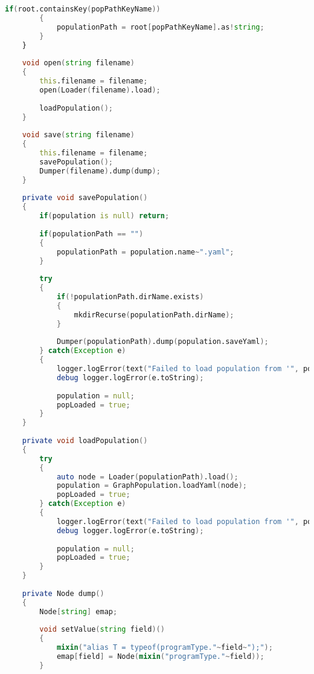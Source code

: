 \documentclass[russian,utf8,emptystyle]{eskdtext}
\begin{document}
\begin{lstlisting}[language=D]
        if(root.containsKey(popPathKeyName))
        {
            populationPath = root[popPathKeyName].as!string;
        }
    }
    
    void open(string filename)
    {
        this.filename = filename;
        open(Loader(filename).load);
        
        loadPopulation();
    }
    
    void save(string filename)
    {
        this.filename = filename;
        savePopulation();
        Dumper(filename).dump(dump);
    }
    
    private void savePopulation()
    {
        if(population is null) return;
        
        if(populationPath == "")
        {
            populationPath = population.name~".yaml";
        }
        
        try
        {
            if(!populationPath.dirName.exists)
            {
                mkdirRecurse(populationPath.dirName);
            }
            
            Dumper(populationPath).dump(population.saveYaml);
        } catch(Exception e)
        {
            logger.logError(text("Failed to load population from '", populationPath, "'. Reason: ", e.msg));
            debug logger.logError(e.toString);
            
            population = null;
            popLoaded = true;
        }
    }
    
    private void loadPopulation()
    {
        try
        {
            auto node = Loader(populationPath).load();
            population = GraphPopulation.loadYaml(node);
            popLoaded = true;
        } catch(Exception e)
        {
            logger.logError(text("Failed to load population from '", populationPath, "'. Reason: ", e.msg));
            debug logger.logError(e.toString);
            
            population = null;
            popLoaded = true;
        }
    }
    
    private Node dump()
    {
        Node[string] emap;
        
        void setValue(string field)()
        {
            mixin("alias T = typeof(programType."~field~");");
            emap[field] = Node(mixin("programType."~field));
        }
        

\end{lstlisting}
\end{document}
